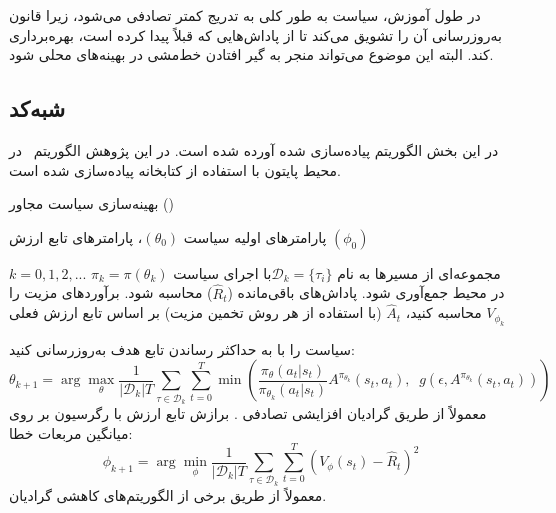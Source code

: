 در طول آموزش، سیاست به طور کلی به تدریج کمتر تصادفی می‌شود، زیرا قانون به‌روزرسانی آن را تشویق می‌کند تا از پاداش‌هایی که قبلاً پیدا کرده است، بهره‌برداری کند. البته این موضوع می‌تواند منجر به گیر افتادن خط‌مشی در بهینه‌های محلی
 شود.
 
 
         \subsection{شبه‌کد
         }
 
 در این بخش الگوریتم
 پیاده‌سازی شده آورده شده است. در این پژوهش الگوریتم~ در محیط پایتون با استفاده از کتابخانه
   \cite{paszke2017automatic}
  پیاده‌سازی شده ‌است.
 



\vspace{1cm}
\begin{algorithm}[H]
\caption{
	بهینه‌سازی سیاست مجاور  ()
	}\label{alg:PPO}
\begin{algorithmic}[1]
پارامترهای اولیه سیاست
$(\theta_0)$، پارامترهای تابع ارزش
$(\phi_0)$

\For $k = 0,1,2,...$
	\State 
	مجموعه‌ای از مسیرها به نام
	 ${\mathcal D}_k = \{\tau_i\}$ 
		​	
	 با اجرای سیاست 
	 $\pi_k = \pi(\theta_k)$
	 در محیط جمع‌آوری شود.
	\State
	 پاداش‌های باقی‌مانده 
	 ($\hat{R}_t$)
	 محاسبه شود.
	\State
	برآوردهای مزیت را محاسبه کنید، $\hat{A}_t$ (با استفاده از هر روش تخمین مزیت) بر اساس تابع ارزش فعلی $V_{\phi_k}$
	
	\State
	سیاست را با به حداکثر رساندن تابع هدف  به‌روزرسانی کنید:
	 \begin{equation*} \theta_{k+1} = \arg \max_{\theta} \frac{1}{|{\mathcal D}_k| T} \sum_{\tau \in {\mathcal D}_k} \sum_{t=0}^T \min\left( \frac{\pi_{\theta}(a_t|s_t)}{\pi_{\theta_k}(a_t|s_t)} A^{\pi_{\theta_k}}(s_t,a_t), \;\; g(\epsilon, A^{\pi_{\theta_k}}(s_t,a_t)) \right) \end{equation*}
	 معمولاً از طریق گرادیان افزایشی تصادفی .
	 \State
	 برازش تابع ارزش با رگرسیون بر روی میانگین مربعات خطا:
	 \begin{equation*} \phi_{k+1} = \arg \min_{\phi} \frac{1}{|{\mathcal D}_k| T} \sum_{\tau \in {\mathcal D}_k} \sum_{t=0}^T\left( V_{\phi} (s_t) - \hat{R}_t \right)^2 \end{equation*} 
	 معمولاً از طریق برخی از الگوریتم‌های کاهشی گرادیان.
\EndFor
\end{algorithmic}
\end{algorithm}














